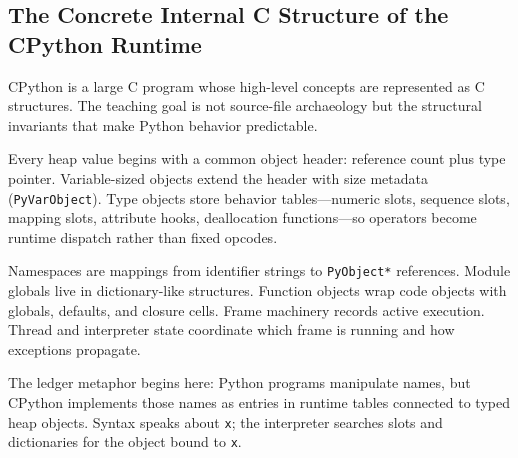 \subsection{The Concrete Internal C Structure of the CPython Runtime}

CPython is a large C program whose high-level concepts are represented as C structures. The teaching goal is not source-file archaeology but the structural invariants that make Python behavior predictable.

Every heap value begins with a common object header: reference count plus type pointer. Variable-sized objects extend the header with size metadata (\texttt{PyVarObject}). Type objects store behavior tables---numeric slots, sequence slots, mapping slots, attribute hooks, deallocation functions---so operators become runtime dispatch rather than fixed opcodes.

Namespaces are mappings from identifier strings to \texttt{PyObject*} references. Module globals live in dictionary-like structures. Function objects wrap code objects with globals, defaults, and closure cells. Frame machinery records active execution. Thread and interpreter state coordinate which frame is running and how exceptions propagate.

The ledger metaphor begins here: Python programs manipulate names, but CPython implements those names as entries in runtime tables connected to typed heap objects. Syntax speaks about \texttt{x}; the interpreter searches slots and dictionaries for the object bound to \texttt{x}.

